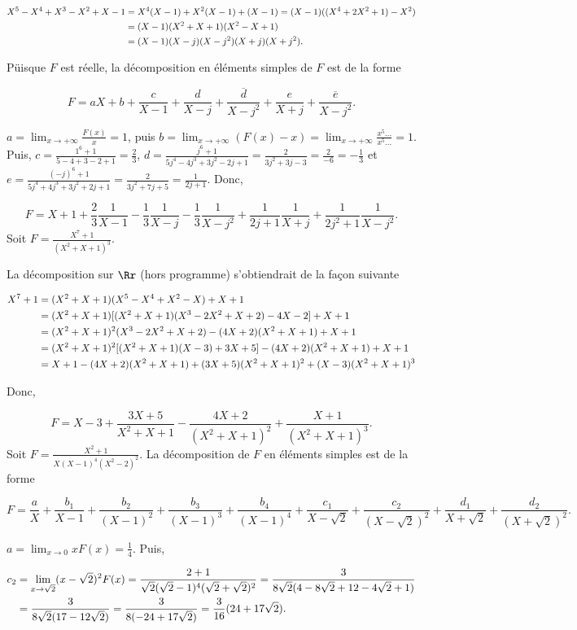 {{\begin{align*}\ensuremath
X^5-X^4+X^3-X^2+X-1&=X^4(X-1)+X^2(X-1)+(X-1)=(X-1)((X^4+2X^2+1)-X^2)\\
 &=(X-1)(X^2+X+1)(X^2-X+1)\\
 &=(X-1)(X-j)(X-j^2)(X+j)(X+j^2).
\end{align*}

Püisque $F$ est réelle, la décomposition en éléments simples de $F$ est de la forme

$$F=aX+b+\frac{c}{X-1}+\frac{d}{X-j}+\frac{\overline{d}}{X-j^2}+\frac{e}{X+j}+\frac{\overline{e}}{X-j^2}.$$

$a=\lim_{x\rightarrow +\infty}\frac{F(x)}{x}=1$, puis $b=\lim_{x\rightarrow +\infty}(F(x)-x)=\lim_{x\rightarrow +\infty}\frac{x^5...}{x^5...}=1$. Puis, $c=\frac{1^6+1}{5-4+3-2+1}=\frac{2}{3}$,
$d=\frac{j^6+1}{5j^4-4j^3+3j^2-2j+1}=\frac{2}{3j^2+3j-3}=\frac{2}{-6}=-\frac{1}{3}$ et $e=\frac{(-j)^6+1}{5j^4+4j^3+3j^2+2j+1}=\frac{2}{3j^2+7j+5}=\frac{1}{2j+1}$. Donc,

$$F=X+1+\frac{2}{3}\frac{1}{X-1}-\frac{1}{3}\frac{1}{X-j}-\frac{1}{3}\frac{1}{X-j^2}+\frac{1}{2j+1}\frac{1}{X+j}+\frac{1}{2j^2+1}\frac{1}{X-j^2}.$$
Soit $F=\frac{X^7+1}{(X^2+X+1)^3}$.

La décomposition sur $\Rr$ (hors programme) s'obtiendrait de la façon suivante

\begin{align*}\ensuremath
X^7+1&=(X^2+X+1)(X^5-X^4+X^2-X)+X+1\\
 &=(X^2+X+1)[(X^2+X+1)(X^3-2X^2+X+2)-4X-2]+X+1\\
 &=(X^2+X+1)^2(X^3-2X^2+X+2)-(4X+2)(X^2+X+1)+X+1\\
 &=(X^2+X+1)^2[(X^2+X+1)(X-3)+3X+5]-(4X+2)(X^2+X+1)+X+1\\
 &=X+1-(4X+2)(X^2+X+1)+(3X+5)(X^2+X+1)^2+(X-3)(X^2+X+1)^3
\end{align*}

Donc,

$$F=X-3+\frac{3X+5}{X^2+X+1}-\frac{4X+2}{(X^2+X+1)^2}+\frac{X+1}{(X^2+X+1)^3}.$$
Soit $F=\frac{X^2+1}{X(X-1)^4(X^2-2)^2}$. La décomposition de $F$ en éléments simples est de la forme

$$F=\frac{a}{X}+\frac{b_1}{X-1}+\frac{b_2}{(X-1)^2}+\frac{b_3}{(X-1)^3}+\frac{b_4}{(X-1)^4}+\frac{c_1}{X-\sqrt{2}}+\frac{c_2}{(X-\sqrt{2})^2}+\frac{d_1}{X+\sqrt{2}}+\frac{d_2}{(X+\sqrt{2})^2}.$$

$a=\lim_{x\rightarrow 0}xF(x)=\frac{1}{4}$. Puis, 

\begin{align*}\ensuremath
c_2&=\lim_{x \rightarrow \sqrt{2}}(x-\sqrt{2})^2F(x)=\frac{2+1}{\sqrt{2}(\sqrt{2}-1)^4(\sqrt{2}+\sqrt{2})^2}
=\frac{3}{8\sqrt{2}(4-8\sqrt{2}+12-4\sqrt{2}+1)}\\
 &=\frac{3}{8\sqrt{2}(17-12\sqrt{2})}=\frac{3}{8(-24+17\sqrt{2})}=\frac{3}{16}(24+17\sqrt{2}).
\end{align*}

}}
